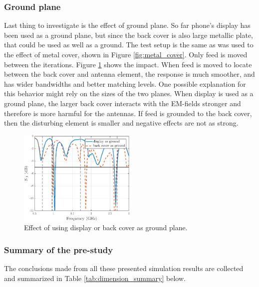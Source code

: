 \subsubsection{Ground plane}
\label{sec:ground_plane}
Last thing to investigate is the effect of ground plane. So far phone's display has been used as a ground plane, but since the back cover is also large metallic plate, that could be used as well as a ground. The test setup is the same as was used to the effect of metal cover, shown in Figure \ref{fig:metal_cover}. Only feed is moved between the iterations. Figure \ref{fig:ground_plane} shows the impact. When feed is moved to locate between the back cover and antenna element, the response is much smoother, and has wider bandwidths and better matching levels. One possible explanation for this behavior might rely on the sizes of the two planes. When display is used as a ground plane, the larger back cover interacts with the EM-fields stronger and therefore is more harmful for the antennas. If feed is grounded to the back cover, then the disturbing element is smaller and negative effects are not as strong.

\begin{figure}[H]
    \centering
    \includegraphics[width=0.5\textwidth]{img/ground_vs_display.eps}
    \caption{Effect of using display or back cover as ground plane.}
    \label{fig:ground_plane}
\end{figure}

\subsubsection{Summary of the pre-study}
\label{sec:pre_study_summary}
The conclusions made from all these presented simulation results are collected and summarized in Table \ref{tab:dimension_summary} below. 

